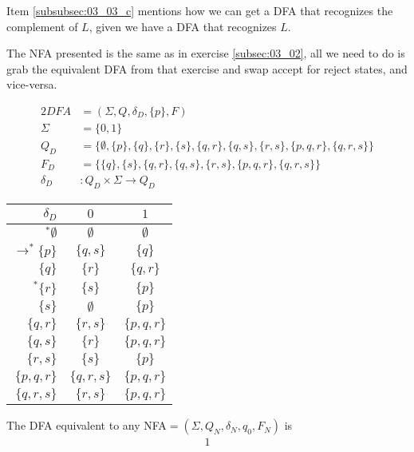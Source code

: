 \documentclass[docid=TP03]{tcom_TP}
\begin{document}
{
\begin{remark}
	Item \ref{subsubsec:03_03_c} mentions how we can get a DFA that recognizes the complement of $L$, given we have a DFA that recognizes $L$.
\end{remark}
\begin{remark}
	The NFA presented is the same as in exercise \ref{subsec:03_02}, all we need to do is grab the equivalent DFA from that exercise and swap accept for reject states, and vice-versa.
\end{remark}
\begin{alignat*}{2}
	DFA       &= (\Sigma, Q, \delta_D, \{p\}, F)\\
	\Sigma    &= \{0,1\}\\
	Q_D       &= \{\emptyset,\{p\},\{q\},\{r\},\{s\},\{q,r\},\{q,s\},\{r,s\},\{p,q,r\},\{q,r,s\}\}\\
	F_D       &= \{\{q\},\{s\},\{q,r\},\{q,s\},\{r,s\},\{p,q,r\},\{q,r,s\}\}\\
	\delta_D &\colon Q_D \times \Sigma \rightarrow Q_D
\end{alignat*}
\begin{center}
\begin{tabular}{ r | c c }
 $\delta_D$ & $0$ & $1$ \\
 \hline
 $^* \emptyset             $ & $\emptyset  $ & $\emptyset  $ \\
 $\rightarrow^* \{p      \}$ & $\{  q,  s\}$ & $\{  q    \}$ \\  
 $                 \{  q    \}$ & $\{    r  \}$ & $\{  q,r  \}$ \\
 $^*            \{    r  \}$ & $\{      s\}$ & $\{p      \}$ \\
 $                 \{      s\}$ & $\emptyset  $ & $\{p      \}$ \\
 $                 \{  q,r  \}$ & $\{    r,s\}$ & $\{p,q,r  \}$ \\
 $                 \{  q,  s\}$ & $\{    r  \}$ & $\{p,q,r  \}$ \\
 $                 \{    r,s\}$ & $\{      s\}$ & $\{p      \}$ \\
 $                 \{p,q,r  \}$ & $\{  q,r,s\}$ & $\{p,q,r  \}$ \\
 $                 \{  q,r,s\}$ & $\{    r,s\}$ & $\{p,q,r  \}$
\end{tabular}
\end{center}
\pagebreak
{}
The DFA equivalent to any NFA$=(\Sigma,Q_N,\delta_N,q_0,F_N)$ is
\begin{alignat}{1}

\end{alignat}}
\end{document}
